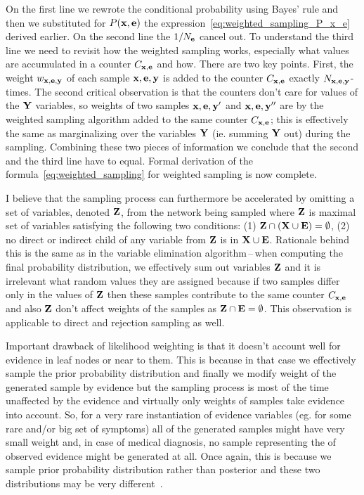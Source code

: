 \documentclass[english,cover]{fitthesis} %
\newcommand{\vars}[1]{{\bold{#1}}}         %
\begin{document}
On the first line we rewrote the conditional probability using Bayes' rule and then we substituted for $P(\vars{x},\vars{e})$ the expression~\eqref{eq:weighted_sampling_P_x_e} derived earlier.
On the second line the $1/N_\vars{e}$ cancel out.
To understand the third line we need to revisit how the weighted sampling works, especially what values are accumulated in a counter $C_{\vars{x},\vars{e}}$ and how. There are two key points. First, the weight $w_{\vars{x},\vars{e},\vars{y}}$ of each sample $\vars{x},\vars{e},\vars{y}$ is added to the counter $C_{\vars{x},\vars{e}}$ exactly $N_{\vars{x},\vars{e},\vars{y}}$-times. The second critical observation is that the counters don't care for values of the $\vars{Y}$ variables, so weights of two samples $\vars{x},\vars{e},\vars{y'}$ and $\vars{x},\vars{e},\vars{y''}$ are by the weighted sampling algorithm added to the same counter $C_{\vars{x},\vars{e}}$; this is effectively the same as marginalizing over the variables $\vars{Y}$ (ie. summing $\vars{Y}$ out) during the sampling.
  Combining these two pieces of information we conclude that the second and the third line have to equal. Formal derivation of the formula~\eqref{eq:weighted_sampling} for weighted sampling is now complete.

\medskip

I believe that the sampling process can furthermore be accelerated by omitting a set of variables, denoted $\vars{Z}$, from the network being sampled where $\vars{Z}$ is maximal set of variables satisfying the following two conditions: (1) $\vars{Z} \cap (\vars{X} \cup \vars{E}) = \emptyset$, (2) no direct or indirect child of any variable from $\vars{Z}$ is in $\vars{X} \cup \vars{E}$. Rationale behind this is the same as in the variable elimination algorithm\,--\,when computing the final probability distribution, we effectively sum out variables $\vars{Z}$ and it is irrelevant what random values they are assigned because if two samples differ only in the values of $\vars{Z}$ then these samples contribute to the same counter $C_{\vars{x},\vars{e}}$ and also $\vars{Z}$ don't affect weights of the samples as $\vars{Z} \cap \vars{E} = \emptyset$. This observation is applicable to direct and rejection sampling as well.

Important drawback of likelihood weighting is that it doesn't account well for evidence in leaf nodes or near to them. This is because in that case we effectively sample the prior probability distribution and finally we modify weight of the generated sample by evidence but the sampling process is most of the time unaffected by the evidence and virtually only weights of samples take evidence into account. So, for a very rare instantiation of evidence variables (eg. for some rare and/or big set of symptoms) all of the generated samples might have very small weight and, in case of medical diagnosis, no sample representing the  of observed evidence might be generated at all. Once again, this is because we sample prior probability distribution rather than posterior and these two distributions may be very different~\cite[p.~503]{pgm}.
\end{document}
